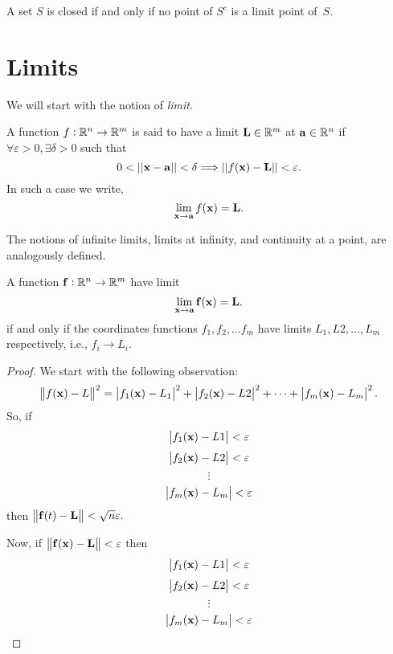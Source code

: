 \begin{multicols}{2}
\begin{problem}[Putnam 1998]
\end{problem}

\begin{problem}
 A set $S$ is closed if and only if
no point of $S^c$ is a limit point of~$S.$
\label{exerclosed}
\end{problem}


\end{multicols}

\section{Limits}
 We will start
with the notion of {\em limit}.



\begin{df}
A function $f:\mathbb{R}^n \rightarrow \mathbb{R}^m$ is said to have a limit
$\mathbf{ L}\in\mathbb{R}^m$ at $\mathbf{ a}\in\mathbb{R}^n$ if $\forall
\varepsilon
> 0,  \exists \delta > 0$ such that
$$0 < ||\mathbf{ x} - \mathbf{ a}|| < \delta \Longrightarrow ||f(\mathbf{ x}) - \mathbf{ L}|| <
\varepsilon.$$In such a case we write,
$$\lim\limits _{\mathbf{ x}\rightarrow \mathbf{ a}} f(\mathbf{ x}) = \mathbf{ L}.$$
\end{df}

The notions of infinite limits, limits at infinity, and continuity
at a point, are analogously defined. 


\begin{thm} 
A function $\mathbf{ f}:\mathbb{R}^n \rightarrow \mathbb{R}^m$ have limit
$$\lim\limits _{\mathbf{ x}\rightarrow \mathbf{ a}} \mathbf{ f}(\mathbf{ x}) = \mathbf{ L}.$$
if and only if the coordinates functions $f_1,f_2,\dots f_m$ have limits 
$L_1,L2,\dots,L_m$ respectively, i.e., $f_i\to L_i$.
\label{thm:limite:components}
\end{thm}

\begin{proof}
 
We start with the following observation:
\[
\left\| f(\mathbf{ x})-L\right\| ^2=\left| f_1(\mathbf{ x})-L_1\right| ^2+\left|
f_2(\mathbf{ x})-L2\right| ^2+\cdots+\left| f_m(\mathbf{ x})-L_m\right| ^2. 
\]
So, if
\[
\left| f_1(\mathbf{ x})-L1\right| <\varepsilon 
\]
\[
\left| f_2(\mathbf{ x})-L2\right| <\varepsilon 
\]
\[\vdots\]
\[
\left| f_m(\mathbf{ x})-L_m\right| <\varepsilon 
\]
then $\left\| \mathbf{ f}(t)-\mathbf{ L} \right\| <\sqrt{n}\varepsilon .$ 

Now, if $\left\|
\mathbf{ f}(\mathbf{ x})-\mathbf{ L}\right\| <\varepsilon $ then 
\[
\left| f_1(\mathbf{ x})-L1\right| <\varepsilon 
\]
\[
\left| f_2(\mathbf{ x})-L2\right| <\varepsilon 
\]
\[\vdots\]
\[
\left| f_m(\mathbf{ x})-L_m\right| <\varepsilon 
\]
\end{proof}




